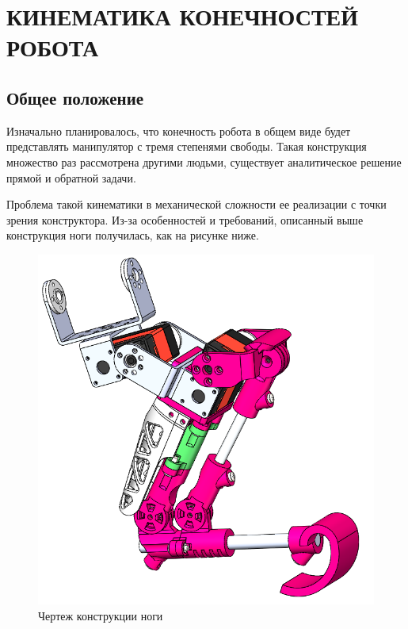 \chapter{\MakeUppercase{Кинематика конечностей робота}}
\section{Общее положение}
Изначально планировалось, что конечность робота в общем виде будет представлять манипулятор с тремя степенями свободы. Такая конструкция множество раз рассмотрена другими людьми, существует аналитическое решение прямой и обратной задачи.

Проблема такой кинематики в механической сложности ее реализации с точки зрения конструктора. Из-за особенностей и требований, описанный выше \fixme конструкция ноги получилась, как на рисунке ниже.
\begin{figure}[h]
    \centering
    \includegraphics[scale=0.5]{chapter_kinematics/figure2.png}
    \caption{Чертеж конструкции ноги}
    \label{}
\end{figure}

